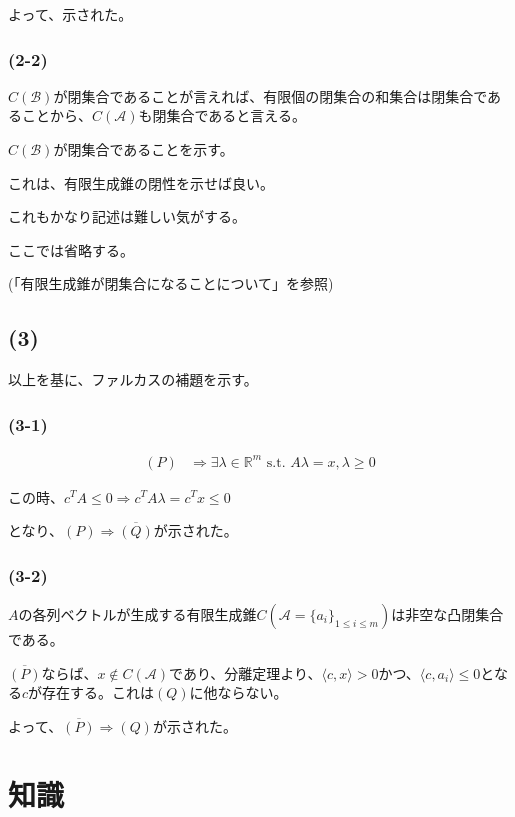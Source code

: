 \documentclass[a4paper, 10pt, dvipdfmx]{jlreq}
\begin{document}
よって、示された。

\subsubsection*{(2-2)}

$C(\mathcal{B})$が閉集合であることが言えれば、有限個の閉集合の和集合は閉集合であることから、$C(\mathcal{A})$も閉集合であると言える。

$C(\mathcal{B})$が閉集合であることを示す。

これは、有限生成錐の閉性を示せば良い。

これもかなり記述は難しい気がする。

ここでは省略する。

(「有限生成錐が閉集合になることについて」を参照)

\subsection*{(3)}

以上を基に、ファルカスの補題を示す。

\subsubsection*{(3-1)}

\begin{align*}
    (P) & \Rightarrow \exists \lambda \in \mathbb{R}^m \text{ s.t. } A\lambda =x,\lambda \geq 0
\end{align*}

この時、$c^TA \leq 0 \Rightarrow c^TA\lambda =c^Tx \leq 0$

となり、$(P)\Rightarrow \overline{(Q)}$が示された。

\subsubsection*{(3-2)}

$A$の各列ベクトルが生成する有限生成錐$C(\mathcal{A}=\{a_i\}_{1\leq i \leq m})$は非空な凸閉集合である。

$\overline{(P)}$ならば、$x \notin C(\mathcal{A})$であり、分離定理より、$\langle c,x\rangle >0$かつ、$\langle c,a_i\rangle \leq 0$となる$c$が存在する。これは$(Q)$に他ならない。

よって、$\overline{(P)}\Rightarrow (Q)$が示された。

\section{知識}
\end{document}
